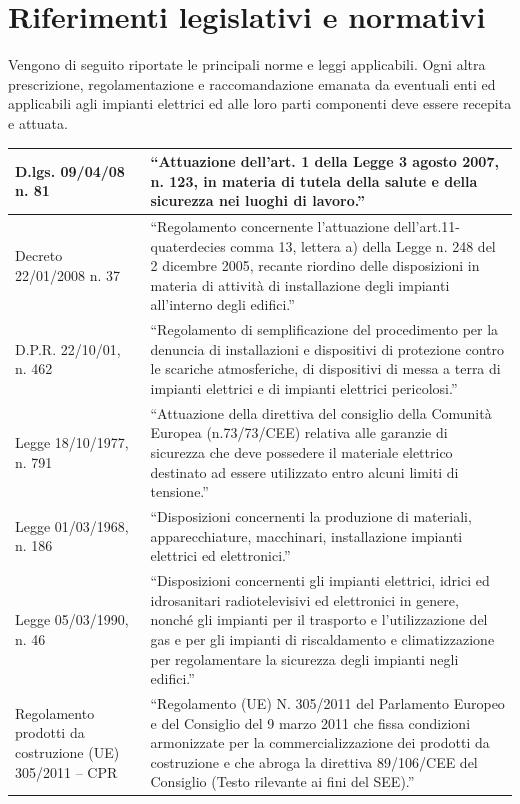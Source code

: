 \newpage
\pagestyle{fancy}

\section{Riferimenti legislativi e normativi}

Vengono di seguito riportate le principali norme e leggi applicabili. Ogni altra prescrizione, regolamentazione e raccomandazione emanata da eventuali enti ed applicabili agli impianti elettrici ed alle loro parti componenti deve essere recepita e attuata.

\begin{longtable}{|p{4.2cm}|p{9.5cm}|}

\hline
D.lgs. 09/04/08 n. 81 & ``Attuazione dell'art. 1 della Legge 3 agosto 2007, n. 123, in materia di tutela della salute e della sicurezza nei luoghi di lavoro.'' \\
\hline
Decreto 22/01/2008 n. 37 & ``Regolamento concernente l'attuazione dell'art.11-quaterdecies comma 13, lettera a) della Legge n. 248 del 2 dicembre 2005, recante riordino delle disposizioni in materia di attività di installazione degli impianti all'interno degli edifici.'' \\
\hline
D.P.R. 22/10/01, n. 462 & ``Regolamento di semplificazione del procedimento per la denuncia di installazioni e dispositivi di protezione contro le scariche atmosferiche, di dispositivi di messa a terra di impianti elettrici e di impianti elettrici pericolosi.'' \\
\hline
Legge 18/10/1977, n. 791 & ``Attuazione della direttiva del consiglio della Comunità Europea (n.73/73/CEE) relativa alle garanzie di sicurezza che deve possedere il materiale elettrico destinato ad essere utilizzato entro alcuni limiti di tensione.'' \\
\hline
Legge 01/03/1968, n. 186 & ``Disposizioni concernenti la produzione di materiali, apparecchiature, macchinari, installazione impianti elettrici ed elettronici.'' \\
\hline
Legge 05/03/1990, n. 46 & ``Disposizioni concernenti gli impianti elettrici, idrici ed idrosanitari radiotelevisivi ed elettronici in genere, nonché gli impianti per il trasporto e l'utilizzazione del gas e per gli impianti di riscaldamento e climatizzazione per regolamentare la sicurezza degli impianti negli edifici.'' \\
\hline
Regolamento prodotti da costruzione (UE) 305/2011 -- CPR & ``Regolamento (UE) N. 305/2011 del Parlamento Europeo e del Consiglio del 9 marzo 2011 che fissa condizioni armonizzate per la commercializzazione dei prodotti da costruzione e che abroga la direttiva 89/106/CEE del Consiglio (Testo rilevante ai fini del SEE).'' \\

\end{longtable}
